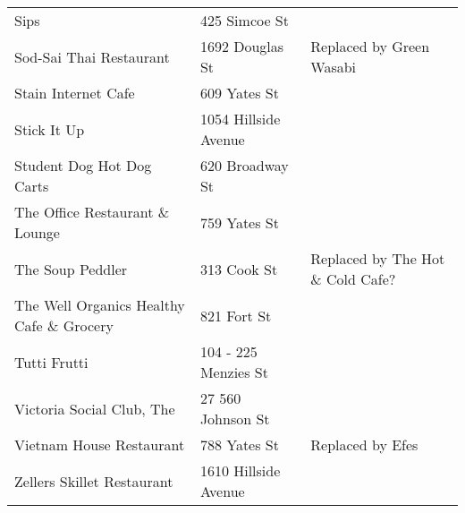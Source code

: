 \documentclass[9pt]{article}
\begin{document}
\begin{center}
\begin{tabular}{l|l|l}
Sips & 425 Simcoe St & \\
Sod-Sai Thai Restaurant & 1692 Douglas St & Replaced by Green Wasabi\\
Stain Internet Cafe & 609 Yates St & \\
Stick It Up & 1054 Hillside Avenue & \\
Student Dog Hot Dog Carts & 620 Broadway St & \\
The Office Restaurant \& Lounge & 759 Yates St & \\
The Soup Peddler & 313 Cook St & Replaced by The Hot \& Cold Cafe?\\
The Well Organics Healthy Cafe \& Grocery & 821 Fort St & \\
Tutti Frutti & 104 - 225 Menzies St & \\
Victoria Social Club, The & 27 560 Johnson St & \\
Vietnam House Restaurant & 788 Yates St & Replaced by Efes\\
Zellers Skillet Restaurant & 1610 Hillside Avenue & \\
\end{tabular}
\end{center}
\end{document}
